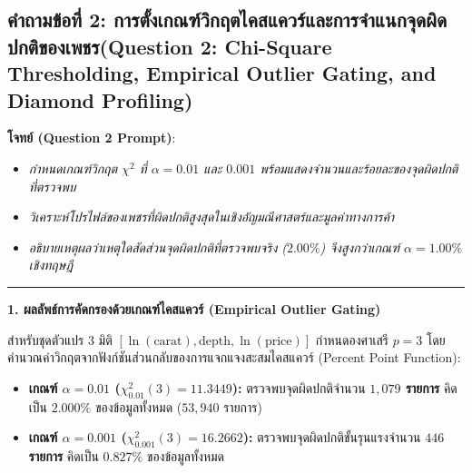 \documentclass[12pt,a4paper]{article}
\begin{document}
\clearpage
\subsection*{คำถามข้อที่ 2: การตั้งเกณฑ์วิกฤตไคสแควร์และการจำแนกจุดผิดปกติของเพชร\newline \normalsize(Question 2: Chi-Square Thresholding, Empirical Outlier Gating, and Diamond Profiling)}
\vspace{-0.5em}

\begin{ansbox}[unbreakable, fontupper={\fontsize{9.6pt}{12.6pt}\selectfont}, left=6pt, right=6pt, top=3pt, bottom=3pt]
\textbf{โจทย์ (Question 2 Prompt)}:
\begin{itemize}[leftmargin=1.2em, itemsep=0pt, topsep=0pt, parsep=0pt]
    \item[(a)] \textit{กำหนดเกณฑ์วิกฤต $\chi^2$ ที่ $\alpha = 0.01$ และ $0.001$ พร้อมแสดงจำนวนและร้อยละของจุดผิดปกติที่ตรวจพบ}
    \item[(b)] \textit{วิเคราะห์โปรไฟล์ของเพชรที่ผิดปกติสูงสุดในเชิงอัญมณีศาสตร์และมูลค่าทางการค้า}
    \item[(c)] \textit{อธิบายเหตุผลว่าเหตุใดสัดส่วนจุดผิดปกติที่ตรวจพบจริง ($2.00\%$) จึงสูงกว่าเกณฑ์ $\alpha = 1.00\%$ เชิงทฤษฎี}
\end{itemize}

\vspace{-0.2em}
\noindent\rule{\linewidth}{0.4pt}
\vspace{-0.2em}

\noindent\textbf{\normalsize 1. ผลลัพธ์การคัดกรองด้วยเกณฑ์ไคสแควร์ (Empirical Outlier Gating)}\par\vspace{0.05em}
สำหรับชุดตัวแปร 3 มิติ $[\ln(\text{carat}), \text{depth}, \ln(\text{price})]$ กำหนดองศาเสรี $p = 3$ โดยคำนวณค่าวิกฤตจากฟังก์ชันส่วนกลับของการแจกแจงสะสมไคสแควร์ (Percent Point Function):
\begin{itemize}[leftmargin=1.2em, itemsep=1.0pt, topsep=1.0pt]
    \item \textbf{เกณฑ์ $\alpha = 0.01$ ($\chi^2_{0.01}(3) = 11.3449$):} ตรวจพบจุดผิดปกติจำนวน \textbf{$1,079$ รายการ} คิดเป็น \textbf{$2.000\%$} ของข้อมูลทั้งหมด ($53,940$ รายการ)
    \item \textbf{เกณฑ์ $\alpha = 0.001$ ($\chi^2_{0.001}(3) = 16.2662$):} ตรวจพบจุดผิดปกติขั้นรุนแรงจำนวน \textbf{$446$ รายการ} คิดเป็น \textbf{$0.827\%$} ของข้อมูลทั้งหมด
\end{itemize}


\end{ansbox}
\end{document}
